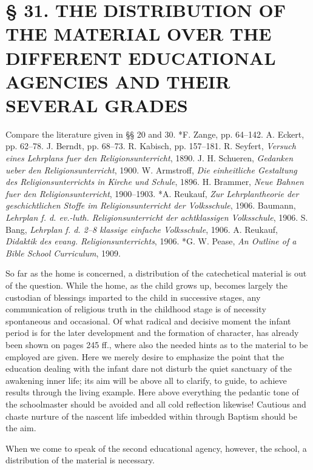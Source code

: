 \chapter[§ 31. THE DISTRIBUTION OF THE MATERIAL]{§ 31. THE DISTRIBUTION OF THE MATERIAL OVER THE DIFFERENT EDUCATIONAL AGENCIES AND THEIR SEVERAL GRADES}

Compare the literature given in §§ 20 and 30. *F. Zange, pp. 64–142. A. Eckert, pp. 62–78. J. Berndt, pp. 68–73. R. Kabisch, pp. 157–181. R. Seyfert, \emph{Versuch eines Lehrplans fuer den Religionsunterricht}, 1890. J. H. Schueren, \emph{Gedanken ueber den Religionsunterricht}, 1900. W. Armstroff, \emph{Die einheitliche Gestaltung des Religionsunterrichts in Kirche und Schule}, 1896. H. Brammer, \emph{Neue Bahnen fuer den Religionsunterricht}, 1900–1903. *A. Reukauf, \emph{Zur Lehrplantheorie der geschichtlichen Stoffe im Religionsunterricht der Volksschule}, 1906. Baumann, \emph{Lehrplan f. d. ev.-luth. Religionsunterricht der achtklassigen Volksschule}, 1906. S. Bang, \emph{Lehrplan f. d. 2–8 klassige einfache Volksschule}, 1906. A. Reukauf, \emph{Didaktik des evang. Religionsunterrichts}, 1906. *G. W. Pease, \emph{An Outline of a Bible School Curriculum}, 1909.

So far as the home is concerned, a distribution of the catechetical material is out of the question. While the home, as the child grows up, becomes largely the custodian of blessings imparted to the child in successive stages, any communication of religious truth in the childhood stage is of necessity spontaneous and occasional. Of what radical and decisive moment the infant period is for the later development and the formation of character, has already been shown on pages 245 ff., where also the needed hints as to the material to be employed are given. Here we merely desire to emphasize the point that the education dealing with the infant dare not disturb the quiet sanctuary of the awakening inner life; its aim will be above all to clarify, to guide, to achieve results through the living example. Here above everything the pedantic tone of the schoolmaster should be avoided and all cold reflection likewise! Cautious and chaste nurture of the nascent life imbedded within through Baptism should be the aim.

When we come to speak of the second educational agency, however, the school, a distribution of the material is necessary.

